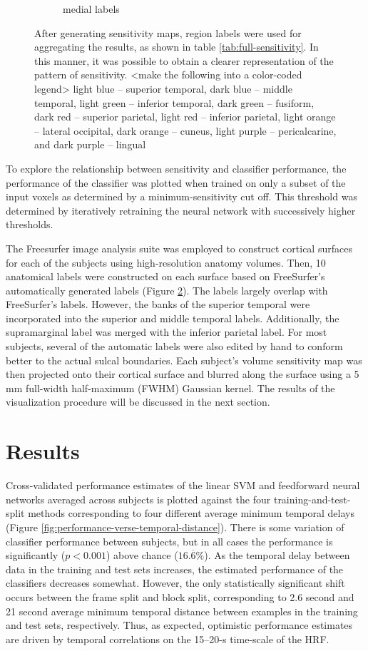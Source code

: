 \documentclass[preprint,5p,authoryear]{elsarticle}
\begin{document}
\begin{figure}
\begin{subfigure}{0.3\textwidth}
\caption{medial labels}
\label{fig:medial-labels}
\end{subfigure}
\caption{After generating sensitivity maps, region labels were used for aggregating the results, as shown in table \ref{tab:full-sensitivity}. In this manner, it was possible to obtain a clearer representation of the pattern of sensitivity. <make the following into a color-coded legend> light blue -- superior temporal, dark blue -- middle temporal, light green -- inferior temporal, dark green -- fusiform, dark red -- superior parietal, light red -- inferior parietal, light orange -- lateral occipital, dark orange -- cuneus, light purple -- pericalcarine, and dark purple -- lingual}
\label{fig:labels}
\end{figure}

To  explore the relationship between sensitivity and classifier performance, the performance of the classifier was plotted when trained on only a subset of the input voxels as determined by a minimum-sensitivity cut off.
This threshold was determined by iteratively retraining the neural network with successively higher thresholds.

The Freesurfer image analysis suite was employed to construct cortical surfaces for each of the subjects using high-resolution anatomy volumes.
Then, 10 anatomical labels were constructed on each surface based on FreeSurfer's automatically generated labels (Figure \ref{fig:labels}).
The labels largely overlap with FreeSurfer's labels.
However, the banks of the superior temporal were incorporated into the superior and middle temporal labels.
Additionally, the supramarginal label was merged with the inferior parietal label.
For most subjects, several of the automatic labels were also edited by hand to conform better to the actual sulcal boundaries.
Each subject's volume sensitivity map was then projected onto their cortical surface and blurred along the surface using a 5 mm full-width half-maximum (FWHM) Gaussian kernel.
The results of the visualization procedure will be discussed in the next section.

\section{Results}
Cross-validated performance estimates of the linear SVM and feedforward neural networks averaged across subjects is plotted against the four training-and-test-split methods corresponding to four different average minimum temporal delays (Figure \ref{fig:performance-verse-temporal-distance}).
There is some variation of classifier performance between subjects, but in all cases the performance is significantly ($p < 0.001$) above chance ($16.\overline{6}$\%). 
As the temporal delay between data in the training and test sets increases, the estimated performance of the classifiers decreases somewhat.
However, the only statistically significant shift occurs between the frame split and block split, corresponding to 2.6 second and 21 second average minimum temporal distance between examples in the training and test sets, respectively.
Thus, as expected, optimistic performance estimates are driven by temporal correlations on the 15--20-s time-scale of the HRF.
\end{document}
